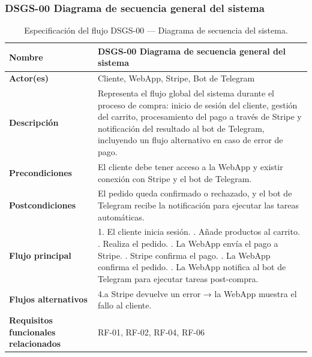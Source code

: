 \subsubsection{DSGS-00 Diagrama de secuencia general del sistema}

\begin{table}[H]
\centering
\small
\begin{tabular}{|m{}|m{}|}
\hline
\textbf{Nombre} & DSGS-00 Diagrama de secuencia general del sistema \\ \hline

\textbf{Actor(es)} & Cliente, WebApp, Stripe, Bot de Telegram \\ \hline

\textbf{Descripción} &
Representa el flujo global del sistema durante el proceso de compra: inicio de sesión del cliente,
gestión del carrito, procesamiento del pago a través de Stripe y notificación del resultado al bot de Telegram,
incluyendo un flujo alternativo en caso de error de pago. \\ \hline

\textbf{Precondiciones} &
El cliente debe tener acceso a la WebApp y existir conexión con Stripe y el bot de Telegram. \\ \hline

\textbf{Postcondiciones} &
El pedido queda confirmado o rechazado, y el bot de Telegram recibe la notificación para ejecutar las tareas automáticas. \\ \hline

\textbf{Flujo principal} &
1. El cliente inicia sesión. \newline
2. Añade productos al carrito. \newline
3. Realiza el pedido. \newline
4. La WebApp envía el pago a Stripe. \newline
5. Stripe confirma el pago. \newline
6. La WebApp confirma el pedido. \newline
7. La WebApp notifica al bot de Telegram para ejecutar tareas post-compra. \\ \hline

\textbf{Flujos alternativos} &
4.a Stripe devuelve un error → la WebApp muestra el fallo al cliente. \\ \hline

\textbf{Requisitos funcionales relacionados} &
RF-01, RF-02, RF-04, RF-06 \\ \hline
\end{tabular}
\caption{Especificación del flujo DSGS-00 — Diagrama de secuencia del sistema.}
\end{table}

\clearpage



